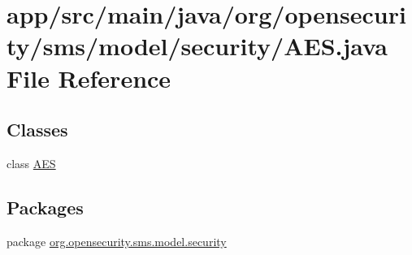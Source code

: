 \hypertarget{a00025}{\section{app/src/main/java/org/opensecurity/sms/model/security/\+A\+E\+S.java File Reference}
\label{a00025}
}
\subsection*{Classes}
\begin{DoxyCompactItemize}
\item 
class \hyperlink{a00001}{A\+E\+S}
\end{DoxyCompactItemize}
\subsection*{Packages}
\begin{DoxyCompactItemize}
\item 
package \hyperlink{a00040}{org.\+opensecurity.\+sms.\+model.\+security}
\end{DoxyCompactItemize}
